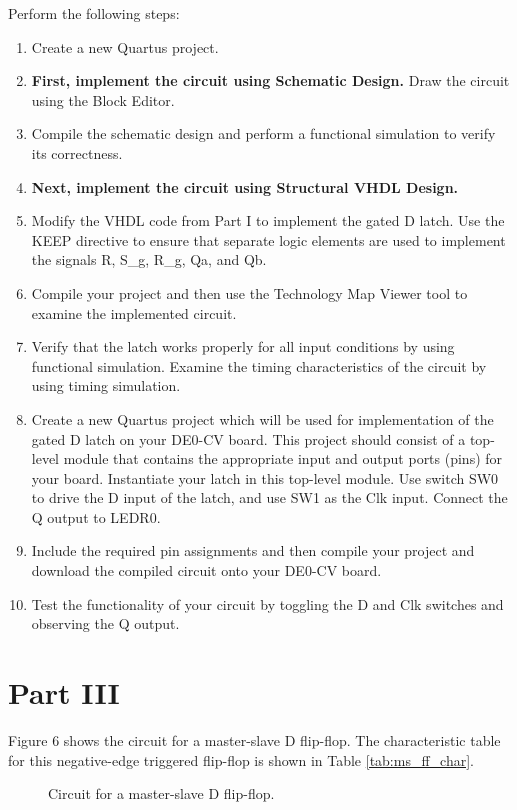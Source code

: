 \documentclass{article}
\begin{document}
Perform the following steps:
\begin{enumerate}
    \item Create a new Quartus project.
    \item \textbf{First, implement the circuit using Schematic Design.} Draw the circuit using the Block Editor.
    \item Compile the schematic design and perform a functional simulation to verify its correctness.
    \item \textbf{Next, implement the circuit using Structural VHDL Design.}
    \item Modify the VHDL code from Part I to implement the gated D latch. Use the KEEP directive to ensure that separate logic elements are used to implement the signals R, S\_g, R\_g, Qa, and Qb.
    \item Compile your project and then use the Technology Map Viewer tool to examine the implemented circuit.
    \item Verify that the latch works properly for all input conditions by using functional simulation. Examine the timing characteristics of the circuit by using timing simulation.
    \item Create a new Quartus project which will be used for implementation of the gated D latch on your DE0-CV board. This project should consist of a top-level module that contains the appropriate input and output ports (pins) for your board. Instantiate your latch in this top-level module. Use switch SW0 to drive the D input of the latch, and use SW1 as the Clk input. Connect the Q output to LEDR0.
    \item Include the required pin assignments and then compile your project and download the compiled circuit onto your DE0-CV board.
    \item Test the functionality of your circuit by toggling the D and Clk switches and observing the Q output.
\end{enumerate}

\section*{Part III}

Figure 6 shows the circuit for a master-slave D flip-flop. The characteristic table for this negative-edge triggered flip-flop is shown in Table \ref{tab:ms_ff_char}.

\begin{figure}[H]
    \centering
    
    \caption{Circuit for a master-slave D flip-flop.}
    \label{fig:master_slave_ff}
\end{figure}
\end{document}
